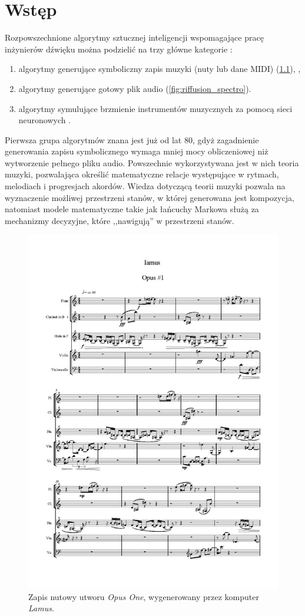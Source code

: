 \chapter{Wstęp}

Rozpowszechnione algorytmy sztucznej inteligencji wspomagające pracę inżynierów dźwięku można podzielić na trzy główne kategorie \cite{analysis_generative} \label{traditional_algos}:

\begin{enumerate}
    \item algorytmy generujące symboliczny zapis muzyki (nuty lub dane MIDI) (\ref{fig:lamus_notes}), \cite{zhang2023language},
    \item algorytmy generujące gotowy plik audio (\ref{fig:riffusion_spectro}).
    \item algorytmy symulujące brzmienie instrumentów muzycznych za pomocą sieci neuronowych \cite{engel2017neural}.
\end{enumerate}

Pierwsza grupa algorytmów znana jest już od lat 80, gdyż zagadnienie generowania zapisu symbolicznego wymaga mniej mocy obliczeniowej niż wytworzenie pełnego pliku audio.
Powszechnie wykorzystywana jest w nich teoria muzyki, pozwalająca określić matematyczne relacje występujące w rytmach, melodiach i progresjach akordów.
Wiedza dotyczącą teorii muzyki pozwala na wyznaczenie możliwej przestrzeni stanów, w której generowana jest kompozycja,
natomiast modele matematyczne takie jak łańcuchy Markowa służą za mechanizmy decyzyjne, które ,,nawigują'' w przestrzeni stanów.

\begin{figure}[H]
    \centering
    \includegraphics[width=0.4\linewidth]{rys01/lamus_notes.jpg}
    \caption{Zapis nutowy utworu \textit{Opus One}, wygenerowany przez komputer \textit{Lamus}.}
    \label{fig:lamus_notes}
\end{figure}

